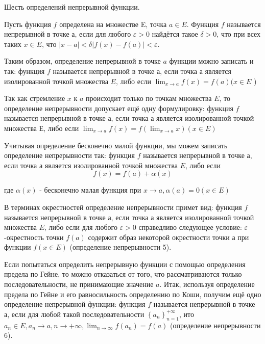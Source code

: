\newpage
\begin{problem}
Шесть определений непрерывной функции.
\end{problem}
\begin{definition}
    Пусть функция $f$ определена на множестве E, точка $a \in E$. Функция $f$ называется непрерывной в точке $а$, если для любого $\varepsilon>0$ найдётся такое $\delta>0$, что при всех таких $x \in E$, что $|x-a|<\delta|f(x)-f(a)|<\varepsilon$.
\end{definition}

\begin{definition}
    Таким образом, определение непрерывной в точке $a$ функции можно записать и так: функция $f$ называется непрерывной в точке а, если точка а является изолированной точкой множества $E$, либо если $\lim _{x \rightarrow a} f(x)=f(a)(x \in E$ )
\end{definition}

\begin{definition}
    Так как стремление $x$ к $a$ происходит только по точкам множества $E$, то определение непрерывности допускает ещё одну формулировку: функция $f$ называется непрерывной в точке а, если точка а является изолированной точкой множества Е, либо если $\lim _{x \rightarrow a} f(x)=f\left(\lim _{x \rightarrow a} x\right)(x \in E)$
\end{definition}

\begin{definition}
    Учитывая определение бесконечно малой функции, мы можем записать определение непрерывности так: функция $f$ называется непрерывной в точке а, если точка а является изолированной точкой множества $E$, либо если
    $$
        f(x)=f(a)+\alpha(x)
    $$

    где $\alpha(x)$ - бесконечно малая функция при $x \rightarrow a, \alpha(a)=0(x \in E)$
\end{definition}

\begin{definition}
    В терминах окрестностей определение непрерывности примет вид: функция $f$ называется непрерывной в точке а, если точка а является изолированной точкой множества $E$, либо если для любого $\varepsilon>0$ справедливо следующее условие: $\varepsilon$-окрестность точки $f(a)$ содержит образ некоторой окрестности точки а при функции $f(x \in E)$ (определение непрерывности 5).
\end{definition}

\begin{definition}
    Если попытаться определить непрерывную функции с помощью определения предела по Гейне, то можно отказаться от того, что рассматриваются только последовательности, не принимающие значение $a$. Итак, используя определение предела по Гейне и его равносильность определению по Коши, получим ещё одно определение непрерывной функции: функция $f$ называется непрерывной в точке а, если для любой такой последовательности $\left\{a_n\right\}_{n=1}^{+\infty}$, ито $a_n \in E, a_n \rightarrow a, n \rightarrow+\infty, \lim _{n \rightarrow \infty} f\left(a_n\right)=f(a)$ (определение непрерывности 6).
\end{definition}

